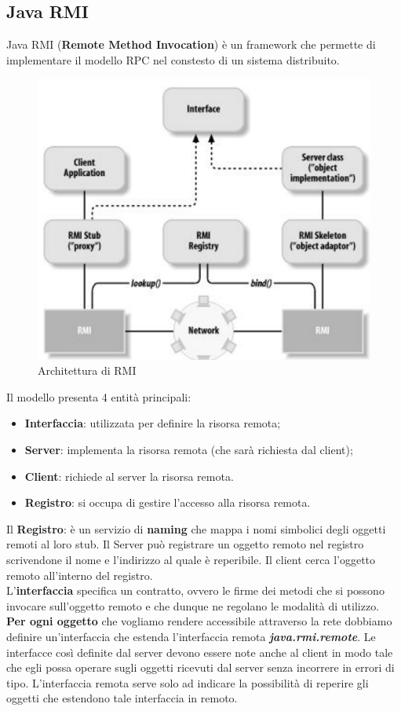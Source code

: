 \documentclass[12pt]{article}
\begin{document}
	\subsection{Java RMI}
		Java RMI (\textbf{Remote Method Invocation}) è un framework che permette di implementare il modello RPC nel constesto di un sistema distribuito.
		\begin{figure}[h!]
			\centering
			\includegraphics[scale=0.40]{img/rmi.png}
			\caption{Architettura di RMI}
		\end{figure}
		Il modello presenta 4 entità principali:
		\begin{itemize}
			\item \textbf{Interfaccia}: utilizzata per definire la risorsa remota;
			\item \textbf{Server}: implementa la risorsa remota (che sarà richiesta dal client);
			\item \textbf{Client}: richiede al server la risorsa remota.
			\item \textbf{Registro}: si occupa di gestire l'accesso alla risorsa remota.
		\end{itemize}
		Il \textbf{Registro}: è un servizio di \textbf{naming} che mappa i nomi simbolici degli oggetti remoti al loro stub. Il Server può registrare un oggetto remoto nel registro scrivendone il nome e l'indirizzo al quale è reperibile. Il client cerca l'oggetto remoto all'interno del registro.\\
		L'\textbf{interfaccia} specifica un contratto, ovvero le firme dei metodi che si possono invocare sull'oggetto remoto e che dunque ne regolano le modalità di utilizzo. \textbf{Per ogni oggetto} che vogliamo rendere accessibile attraverso la rete dobbiamo definire un'interfaccia che estenda l'interfaccia remota \textit{\textbf{java.rmi.remote}}. Le interfacce così definite dal server devono essere note anche al client in modo tale che egli possa operare sugli oggetti ricevuti dal server senza incorrere in errori di tipo. L'interfaccia remota serve solo ad indicare la possibilità di reperire gli oggetti che estendono tale interfaccia in remoto.\\
\end{document}
